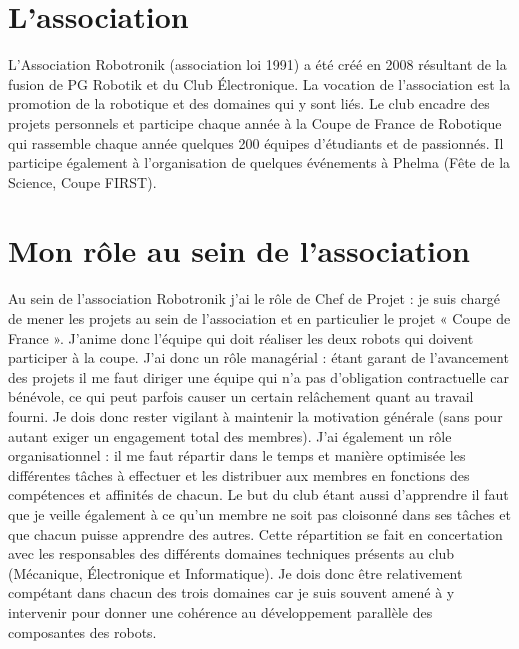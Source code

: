 \documentclass[12pt,a4paper]{article}
\date{}
\begin{document}
\newpage
{}  %
\part{L'association}
L’Association Robotronik (association loi 1991) a été créé en 2008 résultant de la fusion de PG Robotik et du Club Électronique.
La vocation de l'association est la promotion de la robotique et des  domaines qui y sont liés. Le club encadre des projets personnels et participe chaque année à la Coupe de France de Robotique qui rassemble chaque année quelques 200 équipes d’étudiants et de passionnés. Il participe également à l'organisation de quelques événements à Phelma (Fête de la Science, Coupe  FIRST).
\part{Mon rôle au sein de l’association}

Au sein de l'association Robotronik j'ai le rôle de Chef de Projet : je suis chargé de mener les projets au sein de l'association et en particulier  le projet « Coupe de France ». J'anime donc l'équipe qui doit réaliser les deux robots qui doivent participer à la coupe. J'ai donc un rôle managérial : étant garant de l'avancement des projets il me faut diriger une équipe qui n'a pas d'obligation contractuelle car bénévole, ce qui peut parfois causer un certain relâchement quant au travail fourni. Je dois donc rester vigilant à maintenir la motivation générale (sans pour autant exiger un engagement total des membres). J'ai également un rôle organisationnel : il me faut répartir dans le temps et manière optimisée les différentes tâches à effectuer et les distribuer aux membres en fonctions des compétences et affinités de chacun. Le but du club étant aussi d'apprendre il faut que je veille également à ce qu'un membre ne soit pas cloisonné dans ses tâches et que chacun puisse apprendre des autres. Cette répartition se fait en concertation avec les responsables des différents domaines techniques présents au club (Mécanique, Électronique et Informatique). Je dois donc être relativement compétant dans  chacun des trois domaines car je suis souvent amené à y intervenir pour donner une cohérence au développement parallèle des composantes des robots.
\end{document}

